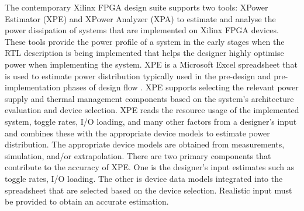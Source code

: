 %
%

The contemporary Xilinx FPGA design suite supports two tools: XPower Estimator (XPE) and  XPower Analyzer (XPA) to estimate and analyse the power dissipation of systems that are implemented on Xilinx FPGA devices.
These tools provide the power profile of a system in the early stages when the RTL description is being implemented that helps the designer highly optimise power when implementing the system.
XPE is a Microsoft Excel spreadsheet that is used to estimate power distribution typically used in the pre-design and pre-implementation phases of design flow \cite{XPowerEstimator2011} .
XPE supports selecting the relevant power supply and thermal management components based on the system's architecture evaluation and device selection.
XPE reads the resource usage of the implemented system, toggle rates, I/O loading, and many other factors from a designer's input and combines these with the appropriate device models to estimate power distribution.
The appropriate device models are obtained from measurements, simulation, and/or extrapolation.
There are two primary components that contribute to the accuracy of XPE.
One is the designer's input estimates such as toggle rates, I/O loading.
The other is device data models integrated into the spreadsheet that are selected based on the device selection.
Realistic input must be provided to obtain an accurate estimation.

